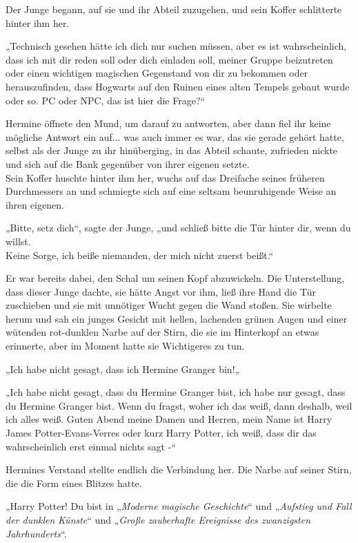 {Der Junge begann, auf sie und ihr Abteil zuzugehen, und sein Koffer schlitterte hinter ihm her.

„Technisch gesehen hätte ich dich nur suchen müssen, aber es ist wahrscheinlich, dass ich mit dir reden soll oder dich einladen soll, meiner Gruppe beizutreten oder einen wichtigen magischen Gegenstand von dir zu bekommen oder herauszufinden, dass Hogwarts auf den Ruinen eines alten Tempels gebaut wurde oder so. PC oder NPC, das ist hier die Frage?“

Hermine öffnete den Mund, um darauf zu antworten, aber dann fiel ihr keine mögliche Antwort ein auf... was auch immer es war, das sie gerade gehört hatte, selbst als der Junge zu ihr hinüberging, in das Abteil schaute, zufrieden nickte und sich auf die Bank gegenüber von ihrer eigenen setzte.\\ Sein Koffer huschte hinter ihm her, wuchs auf das Dreifache seines früheren Durchmessers an und schmiegte sich auf eine seltsam beunruhigende Weise an ihren eigenen.

„Bitte, setz dich“, sagte der Junge, „und schließ bitte die Tür hinter dir, wenn du willst.\\ Keine Sorge, ich beiße niemanden, der mich nicht zuerst beißt.“

Er war bereits dabei, den Schal um seinen Kopf abzuwickeln. Die Unterstellung, dass dieser Junge dachte, sie hätte Angst vor ihm, ließ ihre Hand die Tür zuschieben und sie mit unnötiger Wucht gegen die Wand stoßen. Sie wirbelte herum und sah ein junges Gesicht mit hellen, lachenden grünen Augen und einer wütenden rot-dunklen Narbe auf der Stirn, die sie im Hinterkopf an etwas erinnerte, aber im Moment hatte sie Wichtigeres zu tun.

„Ich habe nicht gesagt, dass ich Hermine Granger bin!„

„Ich habe nicht gesagt, dass du Hermine Granger bist, ich habe nur gesagt, dass du Hermine Granger bist. Wenn du fragst, woher ich das weiß, dann deshalb, weil ich alles weiß. Guten Abend meine Damen und Herren, mein Name ist Harry James Potter-Evans-Verres oder kurz Harry Potter, ich weiß, dass dir das wahrscheinlich erst einmal nichts sagt -“

Hermines Verstand stellte endlich die Verbindung her. Die Narbe auf seiner Stirn, die die Form eines Blitzes hatte.

„Harry Potter! Du bist in „\emph{Moderne magische Geschichte}“ und „\emph{Aufstieg und Fall der dunklen} \emph{Künste}“ und „\emph{Große zauberhafte Ereignisse des zwanzigsten Jahrhunderts}“.

}
